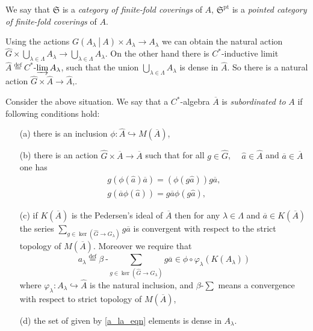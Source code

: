 \documentclass{beamer}
\theoremstyle{plain}
\newcommand{\be}{\begin{equation}}
\newcommand{\ee}{\end{equation}}
\newcommand{\la}{\lambda}
\newcommand{\La}{\Lambda}
\newcommand{\bt}{\beta}           %
\newcommand{\bydef}{\stackrel{\mathrm{def}}{=}}
\newcommand{\hookto}{\hookrightarrow}        %
\begin{document}
\begin{frame}
	\begin{definition}
		We say that $\mathfrak{S}$ is a \textit{category of finite-fold coverings} of $A$, $\mathfrak{S}^{\text{pt}}$ is a \textit{pointed category of finite-fold coverings} of $A$.
	\end{definition}
Using the actions  $G\left(\left.A_\la~\right|~A\right)\times A_\la \to A_\la$ we can obtain  the natural action $\widehat{G}\times \bigcup_{\la\in \La} A_\la \to  \bigcup_{\la\in \La} A_\la$. On the other hand there is $C^*$-inductive limit $\widehat A \bydef C^*$-$\varinjlim A_\la$, such that the union $\bigcup_{\la\in \La} A_\la$ is dense in $\widehat A$. So there is a natural action $\widehat{G} \times \widehat{A}\to \widehat{A}$,.
\end{frame}
\begin{frame}
	Consider the above situation.  We say that a $C^*$-algebra $\overline A$ is \textit{ subordinated to}  $A$ if following conditions hold:
	\begin{enumerate}
		\item [(a)] there is an inclusion $\phi: \widehat A \hookto M\left(\overline A\right)$,
		\item[(b)] there is an action $\widehat{G}\times \overline A \to \overline A$ such that
		for all $g \in \widehat{G}$,  $\quad \widehat a \in \widehat{A}$ and $\overline a \in \overline{A}$ one has
		\be\label{subord_ga_eqn}
		\begin{split}
			g\left(\phi\left(\widehat a \right)\overline{a}\right)  = 	\left(\phi\left(g\widehat a \right)\right) g \overline{a},\\
			g\left( \overline{a}\phi\left(\widehat a \right)\right) =g \overline{a}\phi\left(g\widehat a \right),
		\end{split}
		\ee
		\item[(c)] if $K\left( \overline{A}\right)$ is the Pedersen's ideal of $\overline A$ then   for any $\la\in \La$  and $\overline a \in K\left( \overline{A}\right)$ the series $\sum_{g \in \ker\left(\widehat{G}\to G_\la\right)}g \overline a$ is convergent with respect to the strict topology of $M\left(\overline{A} \right)$. Moreover we require that
		\be\label{a_la_eqn}
		a_\la \bydef 	\bt~\text{-}\sum_{g \in \ker\left(\widehat{G}\to G_\la\right)}g \overline a \in \phi\circ \varphi_\la\left( K\left( A_\la\right) \right) 	
		\ee
		where $\varphi_\la : A_\la \hookto \widehat A$ is the natural inclusion, and $\bt$-$\sum$ means a convergence with respect to strict topology of $M\left( \overline A\right)$,
		\item[(d)] the set of given by \eqref{a_la_eqn} elements is dense in $A_\la$.
	\end{enumerate}

\end{frame}
\end{document}
